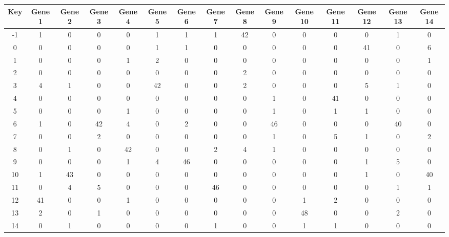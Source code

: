\begin{tabular}{|c|c|c|c|c|c|c|c|c|c|c|c|c|c|c|}
\hline
Key & Gene 1 & Gene 2 & Gene 3 & Gene 4 & Gene 5 & Gene 6 & Gene 7 & Gene 8 & Gene 9 & Gene 10 & Gene 11 & Gene 12 & Gene 13 & Gene 14 \\
\hline
-1 & 1 & 0 & 0 & 0 & 1 & 1 & 1 & 42 & 0 & 0 & 0 & 0 & 1 & 0 \\
0 & 0 & 0 & 0 & 0 & 1 & 1 & 0 & 0 & 0 & 0 & 0 & 41 & 0 & 6 \\
1 & 0 & 0 & 0 & 1 & 2 & 0 & 0 & 0 & 0 & 0 & 0 & 0 & 0 & 1 \\
2 & 0 & 0 & 0 & 0 & 0 & 0 & 0 & 2 & 0 & 0 & 0 & 0 & 0 & 0 \\
3 & 4 & 1 & 0 & 0 & 42 & 0 & 0 & 2 & 0 & 0 & 0 & 5 & 1 & 0 \\
4 & 0 & 0 & 0 & 0 & 0 & 0 & 0 & 0 & 1 & 0 & 41 & 0 & 0 & 0 \\
5 & 0 & 0 & 0 & 1 & 0 & 0 & 0 & 0 & 1 & 0 & 1 & 1 & 0 & 0 \\
6 & 1 & 0 & 42 & 4 & 0 & 2 & 0 & 0 & 46 & 0 & 0 & 0 & 40 & 0 \\
7 & 0 & 0 & 2 & 0 & 0 & 0 & 0 & 0 & 1 & 0 & 5 & 1 & 0 & 2 \\
8 & 0 & 1 & 0 & 42 & 0 & 0 & 2 & 4 & 1 & 0 & 0 & 0 & 0 & 0 \\
9 & 0 & 0 & 0 & 1 & 4 & 46 & 0 & 0 & 0 & 0 & 0 & 1 & 5 & 0 \\
10 & 1 & 43 & 0 & 0 & 0 & 0 & 0 & 0 & 0 & 0 & 0 & 1 & 0 & 40 \\
11 & 0 & 4 & 5 & 0 & 0 & 0 & 46 & 0 & 0 & 0 & 0 & 0 & 1 & 1 \\
12 & 41 & 0 & 0 & 1 & 0 & 0 & 0 & 0 & 0 & 1 & 2 & 0 & 0 & 0 \\
13 & 2 & 0 & 1 & 0 & 0 & 0 & 0 & 0 & 0 & 48 & 0 & 0 & 2 & 0 \\
14 & 0 & 1 & 0 & 0 & 0 & 0 & 1 & 0 & 0 & 1 & 1 & 0 & 0 & 0 \\
\hline
\end{tabular}